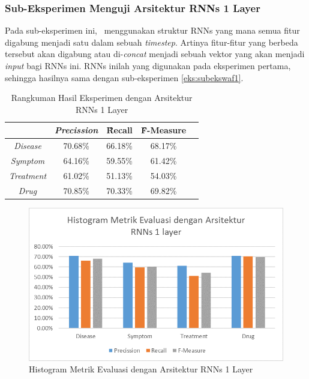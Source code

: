     \subsubsection{Sub-Eksperimen Menguji Arsitektur RNNs 1 Layer}\label{eks2:subeksrnn1}
    Pada sub-eksperimen ini, \saya~menggunakan struktur RNNs yang mana semua fitur digabung menjadi satu dalam sebuah \textit{timestep}.
    Artinya fitur-fitur yang berbeda tersebut akan digabung atau di-\textit{concat} menjadi sebuah vektor yang akan menjadi \textit{input} bagi RNNs ini. RNNs inilah yang digunakan pada eksperimen pertama, sehingga hasilnya sama dengan sub-eksperimen \ref{eks:subekswaf1}.
    
    \begin{table}
    	\centering
    	\caption{Rangkuman Hasil Eksperimen dengan Arsitektur RNNs 1 Layer}
    	\begin{tabular}{|c|c|c|c|c|}
    		\hline
    		& \textit{Precission} & \f{\f{Recall}} & \f{\f{F-Measure}} \\ \hline
    		\textit{Disease}      & 70.68\%             & 66.18\%        & 68.17\%           \\ \hline
    		\textit{Symptom}      & 64.16\%             & 59.55\%        & 61.42\%           \\ \hline
    		\textit{Treatment}    & 61.02\%             & 51.13\%        & 54.03\%           \\ \hline
    		\textit{Drug}		  & 70.85\%             & 70.33\%        & 69.82\%           \\ \hline
    	\end{tabular}
    	\label{table:owndict9}
    \end{table}
    
    \begin{figure}
    	\centering
    	\includegraphics[width=0.85\linewidth]{images/histogram9}
    	\caption{Histogram Metrik Evaluasi dengan Arsitektur RNNs 1 Layer}
    	\label{fig:owndict9}
    \end{figure}
    
